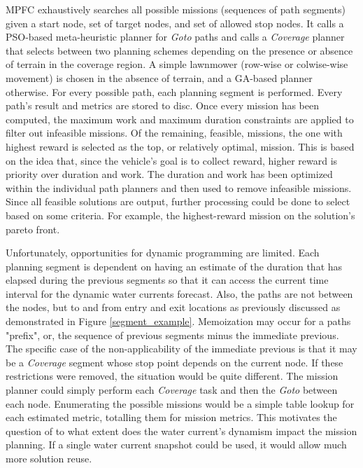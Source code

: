 \documentclass{tamuccthesis}
\begin{document}
MPFC exhaustively searches all possible missions (sequences of path segments) given a start node, set of target nodes, and set of allowed stop nodes. It calls a PSO-based meta-heuristic planner for \textit{Goto} paths and calls a \textit{Coverage} planner that selects between two planning schemes depending on the presence or absence of terrain in the coverage region. A simple lawnmower (row-wise or colwise-wise movement) is chosen in the absence of terrain, and a GA-based planner otherwise. For every possible path, each planning segment is performed. Every path's result and metrics are stored to disc. Once every mission has been computed, the maximum work and maximum duration constraints are applied to filter out infeasible missions. Of the remaining, feasible, missions, the one with highest reward is selected as the top, or relatively optimal, mission. This is based on the idea that, since the vehicle's goal is to collect reward, higher reward is priority over duration and work. The duration and work has been optimized within the individual path planners and then used to remove infeasible missions. Since all feasible solutions are output, further processing could be done to select based on some criteria. For example, the highest-reward mission on the solution's pareto front.

Unfortunately, opportunities for dynamic programming are limited. Each planning segment is dependent on having an estimate of the duration that has elapsed during the previous segments so that it can access the current time interval for the dynamic water currents forecast. Also, the paths are not between the nodes, but to and from entry and exit locations as previously discussed as demonstrated in Figure \ref{segment_example}. Memoization may occur for a paths "prefix", or, the sequence of previous segments minus the immediate previous. The specific case of the non-applicability of the immediate previous is that it may be a \textit{Coverage} segment whose stop point depends on the current node. If these restrictions were removed, the situation would be quite different. The mission planner could simply perform each \textit{Coverage} task and then the \textit{Goto} between each node. Enumerating the possible missions would be a simple table lookup for each estimated metric, totalling them for mission metrics. This motivates the question of to what extent does the water current's dynamism impact the mission planning. If a single water current snapshot could be used, it would allow much more solution reuse. 
\end{document}
